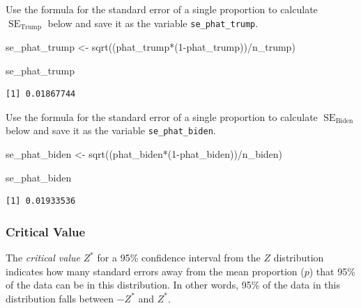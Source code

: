\documentclass[
  letterpaper,
  DIV=11,
  numbers=noendperiod]{scrartcl}
\newenvironment{Shaded}{\begin{snugshade}}{\end{snugshade}}
\newcommand{\DecValTok}[1]{\textcolor[rgb]{0.68,0.00,0.00}{#1}}
\newcommand{\FunctionTok}[1]{\textcolor[rgb]{0.28,0.35,0.67}{#1}}
\newcommand{\NormalTok}[1]{\textcolor[rgb]{0.00,0.23,0.31}{#1}}
\newcommand{\OtherTok}[1]{\textcolor[rgb]{0.00,0.23,0.31}{#1}}
\newcommand{\SpecialCharTok}[1]{\textcolor[rgb]{0.37,0.37,0.37}{#1}}
\begin{document}
Use the formula for the standard error of a single proportion to
calculate \(\operatorname{SE}_{\text{Trump}}\) below and save it as the
variable \texttt{se\_phat\_trump}.

\begin{Shaded}
\begin{Highlighting}[]
\NormalTok{se\_phat\_trump }\OtherTok{\textless{}{-}} \FunctionTok{sqrt}\NormalTok{((phat\_trump}\SpecialCharTok{*}\NormalTok{(}\DecValTok{1}\SpecialCharTok{{-}}\NormalTok{phat\_trump))}\SpecialCharTok{/}\NormalTok{n\_trump)}

\NormalTok{se\_phat\_trump}
\end{Highlighting}
\end{Shaded}

\begin{verbatim}
[1] 0.01867744
\end{verbatim}

Use the formula for the standard error of a single proportion to
calculate \(\operatorname{SE}_{\text{Biden}}\) below and save it as the
variable \texttt{se\_phat\_biden}.

\begin{Shaded}
\begin{Highlighting}[]
\NormalTok{se\_phat\_biden }\OtherTok{\textless{}{-}} \FunctionTok{sqrt}\NormalTok{((phat\_biden}\SpecialCharTok{*}\NormalTok{(}\DecValTok{1}\SpecialCharTok{{-}}\NormalTok{phat\_biden))}\SpecialCharTok{/}\NormalTok{n\_biden)}

\NormalTok{se\_phat\_biden}
\end{Highlighting}
\end{Shaded}

\begin{verbatim}
[1] 0.01933536
\end{verbatim}

\subsubsection{Critical Value}\label{critical-value}

The \emph{critical value} \(Z^*\) for a 95\% confidence interval from
the \(Z\) distribution indicates how many standard errors away from the
mean proportion (\(p\)) that 95\% of the data can be in this
distribution. In other words, 95\% of the data in this distribution
falls between \(-Z^*\) and \(Z^*\).
\end{document}
